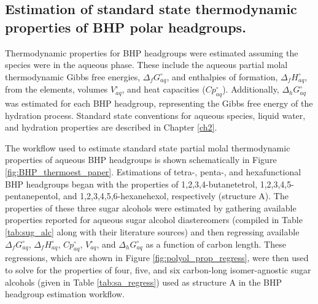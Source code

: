 \subsection{Estimation of standard state thermodynamic properties of BHP polar headgroups.}
Thermodynamic properties for BHP headgroups were estimated assuming the species were in the aqueous phase. These include the aqueous partial molal thermodynamic Gibbs free energies, $\Delta_{f}G_{aq}^{\circ}$, and enthalpies of formation, $\Delta_{f}H_{aq}^{\circ}$, from the elements, volumes $V_{aq}^{\circ}$, and heat capacities ($Cp_{aq}^{\circ}$). Additionally, $\Delta_{h}G^{\circ}_{aq}$ was estimated for each BHP headgroup, representing the Gibbs free energy of the hydration process. Standard state conventions for aqueous species, liquid water, and hydration properties are described in Chapter \ref{ch2}.

The workflow used to estimate standard state partial molal thermodynamic properties of aqueous BHP headgroups is shown schematically in Figure \ref{fig:BHP_thermoest_paper}. Estimations of tetra-, penta-, and hexafunctional BHP headgroups began with the properties of 1,2,3,4-butanetetrol, 1,2,3,4,5-pentanepentol, and 1,2,3,4,5,6-hexanehexol, respectively (structure A). The properties of these three sugar alcohols were estimated by gathering available properties reported for aqueous sugar alcohol diastereomers (compiled in Table \ref{tab:sug_alc} along with their literature sources) and then regressing available $\Delta_{f}G^{\circ}_{aq}$, $\Delta_{f}H^{\circ}_{aq}$, $Cp^{\circ}_{aq}$, $V^{\circ}_{aq}$, and $\Delta_{h}G^{\circ}_{aq}$ as a function of carbon length. These regressions, which are shown in Figure \ref{fig:polyol_prop_regress}, were then used to solve for the properties of four, five, and six carbon-long isomer-agnostic sugar alcohols (given in Table \ref{tab:sa_regress}) used as structure A in the BHP headgroup estimation workflow.


